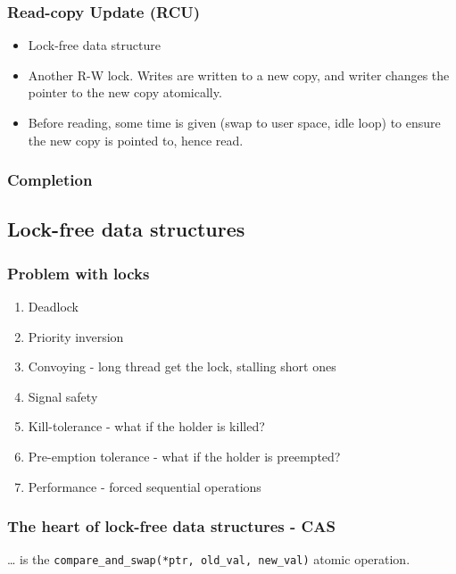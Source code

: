 \documentclass[11pt]{article}
\begin{document}
\subsubsection{Read-copy Update (RCU)}
\label{sec:org3d9ae39}
\begin{itemize}
\item Lock-free data structure
\item Another R-W lock. Writes are written to a new copy, and writer changes the
pointer to the new copy atomically.
\item Before reading, some time is given (swap to user space, idle loop) to ensure
the new copy is pointed to, hence read.
\end{itemize}
\subsubsection{Completion}
\label{sec:orgd3f1484}
\subsection{Lock-free data structures}
\label{sec:org49dda6e}
\subsubsection{Problem with locks}
\label{sec:orgf101066}
\begin{enumerate}
\item Deadlock
\item Priority inversion
\item Convoying - long thread get the lock, stalling short ones
\item Signal safety
\item Kill-tolerance - what if the holder is killed?
\item Pre-emption tolerance - what if the holder is preempted?
\item Performance - forced sequential operations
\end{enumerate}
\subsubsection{The heart of lock-free data structures - CAS}
\label{sec:org046119f}
\ldots{} is the \texttt{compare\_and\_swap(*ptr, old\_val,  new\_val)} atomic operation.
\end{document}
